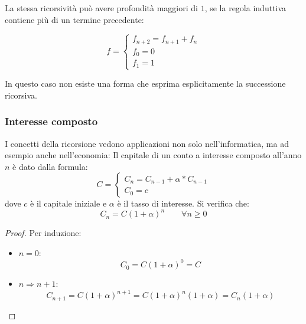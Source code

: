 La stessa ricorsività può avere profondità maggiori di $1$, se la regola induttiva contiene più di un termine precedente:
\begin{examp}
	\[
		f=
		\begin{cases}
			f_{n+2}=f_{n+1}+f_n \\
			f_0=0               \\
			f_1=1
		\end{cases}
	\]
\end{examp}
In questo caso non esiste una forma che esprima esplicitamente la successione ricorsiva.

\subsubsection{Interesse composto}
I concetti della ricorsione vedono applicazioni non solo nell'informatica, ma ad esempio anche nell'economia:
Il capitale di un conto a interesse composto all'anno $n$ è dato dalla formula:
\[
	C=
	\begin{cases}
		C_n=C_{n-1}+\alpha*C_{n-1} \\
		C_0=c
	\end{cases}
\]
dove $c$ è il capitale iniziale e $\alpha$ è il tasso di interesse. Si verifica che:
\[
	C_n=C(1+\alpha)^n \qquad \forall n\geq0
\]
\begin{proof}
	Per induzione:
	\begin{itemize}
		\item $n=0$:
		      \[ C_0=C(1+\alpha)^0=C \]
		\item $n \Rightarrow n+1$:
		      \[ C_{n+1}=C(1+\alpha)^{n+1}=C(1+\alpha)^n(1+\alpha)=C_n(1+\alpha) \]
	\end{itemize}
\end{proof}
